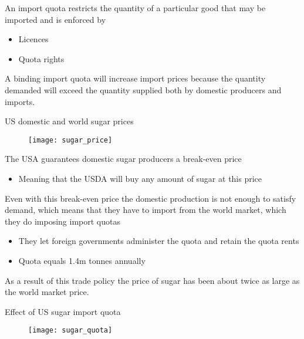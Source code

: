 \documentclass{beamer}
\begin{document}
\begin{frame}
  An import quota restricts the quantity of a particular good that may be imported and is enforced by
  \begin{itemize}
    \item Licences
    \item Quota rights
  \end{itemize}
  A binding import quota will increase import prices because the quantity demanded will exceed the quantity supplied both by domestic producers and imports.  
\end{frame}

\begin{frame}{US domestic and world sugar prices}
  \begin{figure}
    \texttt{[image: sugar\_price]}
  \end{figure}
\end{frame}

\begin{frame}
 The USA guarantees domestic sugar producers a break-even price
 \begin{itemize}
   \item Meaning that the USDA will buy any amount of sugar at this price
 \end{itemize}
  \medskip
  Even with this break-even price the domestic production is not enough to satisfy demand, which means that they have to import from the world market, which they do imposing import quotas
  \begin{itemize}
     \item They let foreign governments administer the quota and retain the quota rents
     \item Quota equals 1.4m tonnes annually
   \end{itemize} 
   \medskip
   As a result of this trade policy the price of sugar has been about twice as large as the world market price. 
\end{frame}

\begin{frame}{Effect of US sugar import quota}
  \begin{figure}
    \texttt{[image: sugar\_quota]}
  \end{figure}
\end{frame}
\end{document}
